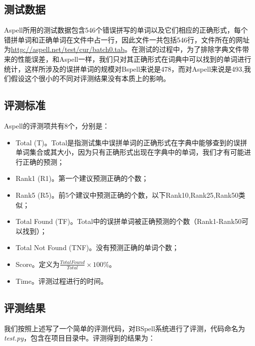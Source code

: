 \documentclass[UTF8,a4paper]{ctexart}
\begin{document}
\subsection{测试数据}

Aspell所用的测试数据包含546个错误拼写的单词以及它们相应的正确形式，每个错拼单词和正确单词在文件中占一行，因此文件一共包括546行，文件所在的网址为\url{http://aspell.net/test/cur/batch0.tab}。在测试的过程中，为了排除字典文件带来的性能误差，和Aspell一样，我们只对其正确形式在词典中可以找到的单词进行统计，这样所涉及的误拼单词的规模对Bspell来说是478，而对Aspell来说是493,我们假设这个很小的不同对评测结果没有本质上的影响。

\subsection{评测标准}

Aspell的评测项共有8个，分别是：

\begin{itemize}
\item Total (T)。Total是指测试集中误拼单词的正确形式在字典中能够查到的误拼单词集合或其大小，因为只有正确形式出现在字典中的单词，我们才有可能进行正确的预测；
\item Rank1 (R1)。第一个建议预测正确的个数；
\item Rank5 (R5)。前5个建议中预测正确的个数，以下Rank10,Rank25,Rank50类似；
\item Total Found (TF)。Total中的误拼单词被正确预测的个数（Rank1-Rank50可以找到）；
\item Total Not Found (TNF)。没有预测正确的单词个数；
\item Score。定义为$\frac{Total Found}{Total} \times 100\%$。
\item Time。评测过程进行的时间。
\end{itemize}

\subsection{评测结果}

我们按照上述写了一个简单的评测代码，对BSpell系统进行了评测，代码命名为\textit{test.py}，包含在项目目录中。评测得到的结果为：
\end{document}
